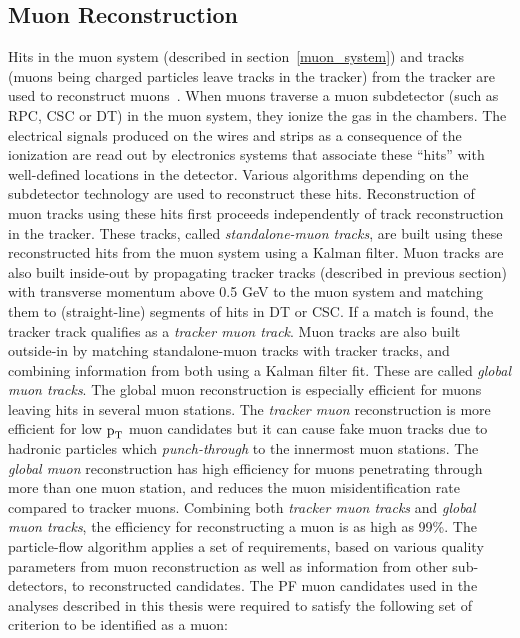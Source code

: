 \subsection{Muon Reconstruction}
\label{mu_recon}
Hits in the muon system (described in section~\ref{muon_system}) and tracks (muons being charged particles leave tracks in the tracker) from the tracker are used to reconstruct muons~\cite{muon_recon2018}. When muons traverse a muon subdetector (such as RPC, CSC or DT) in the muon system, they ionize the gas in the chambers. The electrical signals produced on the wires and strips as a consequence of the ionization are read out by electronics systems that associate these ``hits'' with well-defined locations in the detector. Various algorithms depending on the subdetector technology are used to reconstruct these hits. Reconstruction of muon tracks using these hits first proceeds independently of track reconstruction in the tracker. These tracks, called \textit{standalone-muon tracks}, are built using these reconstructed hits from the muon system using a Kalman filter. Muon tracks are also built inside-out by propagating tracker tracks (described in previous section) with transverse momentum above 0.5 GeV to the muon system and matching them to (straight-line) segments of hits in DT or CSC. If a match is found, the tracker track qualifies as a \textit{tracker muon track}. Muon tracks are also  built outside-in  by matching standalone-muon tracks with tracker tracks, and combining information from both using a Kalman filter fit. These are called \textit{global muon tracks}. The global muon reconstruction is especially efficient for muons leaving hits in several muon stations. The \textit{tracker muon} reconstruction is more efficient for low $\text{p}_\text{T}$ muon candidates but it can cause fake muon tracks due to hadronic particles which \textit{punch-through} to the innermost muon stations. The \textit{global muon} reconstruction has  high efficiency for muons penetrating through more than one muon station, and reduces the muon misidentification rate compared to tracker muons. Combining both \textit{tracker muon tracks} and \textit{global muon tracks}, the efficiency for reconstructing a muon is as high as 99\%. The particle-flow algorithm applies a set of requirements, based on various quality parameters from muon reconstruction as well as information from other sub-detectors, to reconstructed candidates. The PF muon candidates used in the analyses described in this thesis were required to satisfy the following set of criterion to be identified as a muon:

